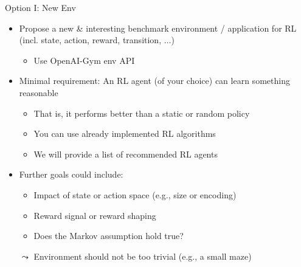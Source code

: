 \documentclass[aspectratio=169]{../latex_main/tntbeamer}  %
\begin{document}
\begin{frame}[c]{Option I: New Env}
	
	\begin{itemize}
		\item Propose a new \& interesting benchmark environment / application for RL (incl. state, action, reward, transition, $\ldots$)
		\begin{itemize}
			\item Use OpenAI-Gym env API
		\end{itemize}
		\item Minimal requirement: An RL agent (of your choice) can learn something reasonable
		\begin{itemize}
			\item That is, it performs better than a static or random policy
			\item You can use already implemented RL algorithms
			\item We will provide a list of recommended RL agents
		\end{itemize}
		\item Further goals could include:
		\begin{itemize}
			\item Impact of state or action space (e.g., size or encoding)
			\item Reward signal or reward shaping
			\item Does the Markov assumption hold true?
		\end{itemize}
		\item[$\leadsto$] Environment should not be too trivial (e.g., a small maze)
	\end{itemize}
	
\end{frame}
\end{document}
